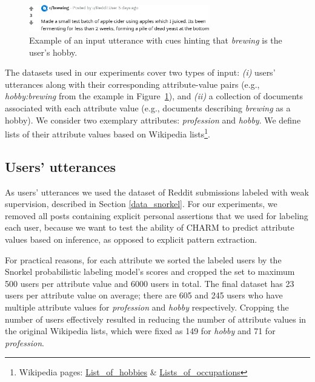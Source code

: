 
\vspace{-5pt}
\begin{figure}[th!]
\centering
\includegraphics[width=0.7\textwidth]{imgs/brew.png}
\caption{
Example of an input utterance with cues hinting that \emph{brewing} is the user's hobby.
}
\label{fig:input}
\end{figure}

\vspace{-5pt}
The datasets used in our experiments cover two types of input: \emph{(i)} users' utterances along with their corresponding attribute-value pairs (e.g., \emph{hobby:brewing} from the example in Figure~\ref{fig:input}),
and 
\emph{(ii)} a collection of documents associated with each attribute value
(e.g., documents describing \emph{brewing} as a hobby).
We consider two exemplary attributes: \emph{profession} and \emph{hobby}.
We define lists of their attribute values based on Wikipedia lists\footnote{Wikipedia pages: \href{https://en.wikipedia.org/wiki/List_of_hobbies}{{List\_of\_hobbies}} \& \href{https://en.wikipedia.org/wiki/Lists_of_occupations}{{Lists\_of\_occupations}}}.

\vspace{-5pt}
\subsection{Users' utterances}

As users' utterances we used the dataset of Reddit submissions labeled with weak supervision, described in Section \ref{data_snorkel}.
For our experiments,
we removed all posts containing explicit personal assertions that we used for labeling each user, because we want to test the ability of CHARM to predict attribute values based on inference, as opposed to explicit pattern extraction. 

For practical reasons, for each attribute
we sorted the labeled users by the Snorkel probabilistic labeling model's scores and cropped the set to maximum 500 users per attribute value and 6000 users in total. 
The final dataset has 23 users per attribute value on average; there are 605 and 245 users who have multiple attribute values for \textit{profession} and \textit{hobby} respectively. Cropping the number of users effectively resulted in reducing the number of attribute values in the original Wikipedia lists, which were fixed as 149 for {\em hobby} and 71 for {\em profession}. 

